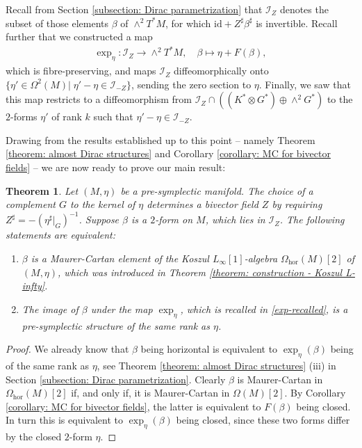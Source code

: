 \documentclass[11pt,thmsa]{amsart}
\newtheorem{theorem}{Theorem}[section]
\theoremstyle{definition}
\newcommand{\hor}{\mathrm{hor}}
\newcommand{\lione}{$L_{\infty}[1]$-algebra }
\begin{document}
{Recall from Section \ref{subsection: Dirac parametrization}
that $\mathcal{I}_Z$ denotes the subset of those elements $\beta$ of
$\wedge^2 T^*M$, for which $\mathrm{id}+Z^\sharp\beta^{\sharp}$ is invertible.
Recall further that we constructed a map
\begin{align}\label{exp-recalled} \exp_\eta: \mathcal{I}_Z\to \wedge^2 T^*M, \quad \beta \mapsto \eta + F(\beta),
\end{align}
which is fibre-preserving, and maps $\mathcal{I}_Z$ diffeomorphically onto $\{\eta'\in \Omega^2(M)|\;\eta'-\eta\in \mathcal{I}_{-Z}\}$,
sending the zero section to $\eta$. Finally, we saw that this map restricts to a  diffeomorphism from
$\mathcal{I}_Z \cap ((K^*\otimes G^*)\oplus \wedge^2 G^*)$ to the $2$-forms 
$\eta'$ of rank $k$ such that $\eta'-\eta\in \mathcal{I}_{-Z}$.



Drawing from the results established up to this point -- {namely Theorem \ref{theorem: almost Dirac structures}  and Corollary \ref{corollary: MC for bivector fields}} -- we are now ready to prove our main result:



\begin{theorem}\label{theorem: main result}
Let $(M,\eta)$ be a pre-symplectic manifold. The choice of a complement $G$ to the kernel of $\eta$ determines a bivector field $Z$ by requiring $Z^\sharp=-(\eta^\sharp \vert_G)^{-1}$. 
Suppose $\beta$ is a $2$-form on $M$, which lies in $\mathcal{I}_Z$.
The following statements are equivalent:

\begin{enumerate}
\item $\beta$ is a Maurer-Cartan element of the Koszul \lione $\Omega_\hor(M)[2]$ of $(M,\eta)$, which was introduced in Theorem \ref{theorem: construction - Koszul L-infty}.
\item The image of $\beta$ under the map $\exp_\eta$, which is recalled in \eqref{exp-recalled}, is a pre-symplectic structure
of the same rank as $\eta$.
\end{enumerate}
\end{theorem}

\begin{proof}
We already know that $\beta$ being horizontal is equivalent to $\exp_\eta(\beta)$ being of the same rank as $\eta$, see Theorem \ref{theorem: almost Dirac structures} (iii) in Section \ref{subsection: Dirac parametrization}.
Clearly  $\beta$ is Maurer-Cartan in $\Omega_\hor(M)[2]$
if, and only if, it is Maurer-Cartan in $\Omega(M)[2]$.
By Corollary \ref{corollary: MC for bivector fields}, the latter is equivalent to $F(\beta)$ being closed. In turn this is equivalent to  $\exp_\eta(\beta)$ being closed, since these two forms differ by the closed $2$-form $\eta$.\end{proof}

}
\end{document}
